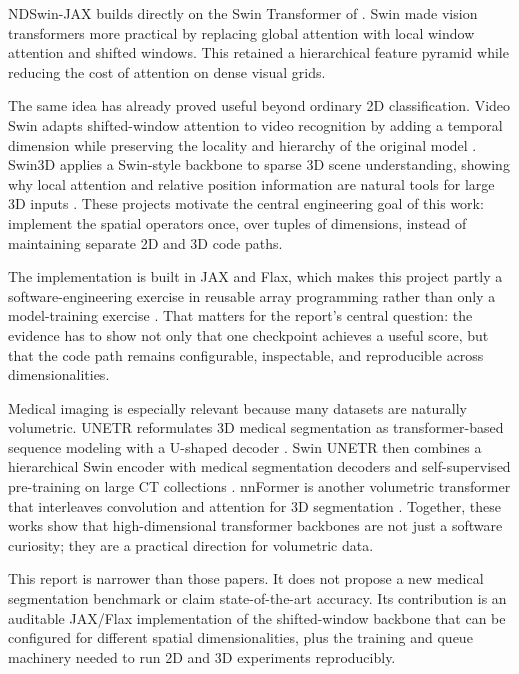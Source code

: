 NDSwin-JAX builds directly on the Swin Transformer of \citet{liu2021swin}. Swin made vision transformers more practical by replacing global attention with local window attention and shifted windows. This retained a hierarchical feature pyramid while reducing the cost of attention on dense visual grids.

The same idea has already proved useful beyond ordinary 2D classification. Video Swin adapts shifted-window attention to video recognition by adding a temporal dimension while preserving the locality and hierarchy of the original model \citep{liu2022videoswin}. Swin3D applies a Swin-style backbone to sparse 3D scene understanding, showing why local attention and relative position information are natural tools for large 3D inputs \citep{yang2023swin3d}. These projects motivate the central engineering goal of this work: implement the spatial operators once, over tuples of dimensions, instead of maintaining separate 2D and 3D code paths.

The implementation is built in JAX and Flax, which makes this project partly a software-engineering exercise in reusable array programming rather than only a model-training exercise \citep{jaxrepo,flaxrepo}. That matters for the report's central question: the evidence has to show not only that one checkpoint achieves a useful score, but that the code path remains configurable, inspectable, and reproducible across dimensionalities.

Medical imaging is especially relevant because many datasets are naturally volumetric. UNETR reformulates 3D medical segmentation as transformer-based sequence modeling with a U-shaped decoder \citep{hatamizadeh2022unetr}. Swin UNETR then combines a hierarchical Swin encoder with medical segmentation decoders and self-supervised pre-training on large CT collections \citep{tang2022swinunetrpretrain,hatamizadeh2022swinunetr}. nnFormer is another volumetric transformer that interleaves convolution and attention for 3D segmentation \citep{zhou2021nnformer}. Together, these works show that high-dimensional transformer backbones are not just a software curiosity; they are a practical direction for volumetric data.

This report is narrower than those papers. It does not propose a new medical segmentation benchmark or claim state-of-the-art accuracy. Its contribution is an auditable JAX/Flax implementation of the shifted-window backbone that can be configured for different spatial dimensionalities, plus the training and queue machinery needed to run 2D and 3D experiments reproducibly.
